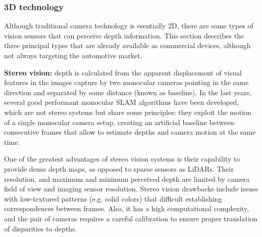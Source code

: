 \subsubsection{3D technology}
Although traditional camera technology is esentially 2D, there are some
types of vision sensors that can perceive depth information. This section
describes the three principal types that are already available as commercial
devices, although not always targeting the automotive market.



\textbf{Stereo vision:} depth is calculated \cite{Hamzah2016} from the 
apparent displacement of visual features in the images capture by two 
monocular cameras pointing in the same direction and separated by some
distance (known as baseline). In the last years, several good performant 
monocular SLAM algorithms \cite{Engel2014}\cite{Engel2018} have been 
developed, which are not stereo systems but share some principles: they 
exploit the motion of a single monocular camera setup, creating an 
artificial baseline between consecutive frames that allow to estimate 
depths and camera motion at the same time.
    
        
One of the greatest advantages of stereo vision systems is their capability 
to provide dense depth maps, as opposed to sparse sensors as LiDARs. Their
resolution, and maximum and minimum perceived depth are limited by
camera field of view and imaging sensor resolution. 
Stereo vision drawbacks include issues with low-textured patterns 
(e.g. solid colors) that difficult establishing correspondences between
frames. Also, it has a high computational complexity, and the pair of 
cameras requires a careful calibration to ensure proper translation of 
disparities to depths.

